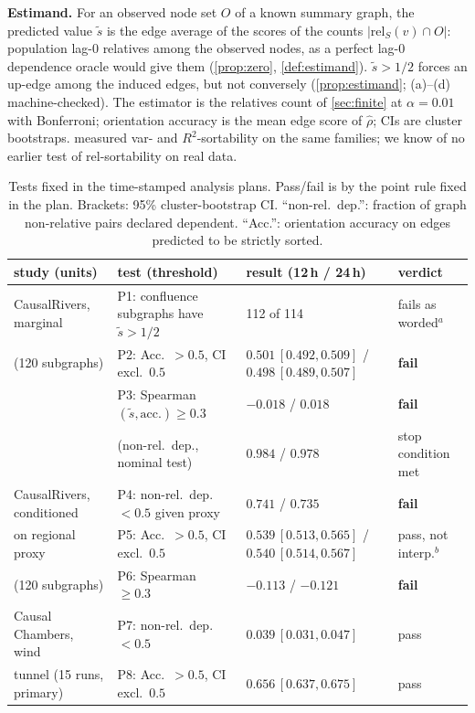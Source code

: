 \documentclass[pdflatex,sn-apa]{sn-jnl}
\theoremstyle{thmstyleone}
\theoremstyle{thmstylethree}
\theoremstyle{thmstyletwo}
\newcommand{\rel}{\mathrm{rel}}
\begin{document}
\textbf{Estimand.} For an observed node set $O$ of a known summary graph, the
predicted value $\tilde s$ is the edge average of the scores of the counts
$|\rel_S(v)\cap O|$: population lag-0 relatives among the observed nodes, as a
perfect lag-0 dependence oracle would give them (\cref{prop:zero},
\cref{def:estimand}). $\tilde s>1/2$ forces an up-edge among the induced
edges, but not conversely (\cref{prop:estimand}; (a)--(d) machine-checked). The
estimator is the relatives count of \cref{sec:finite} at $\alpha=0.01$ with
Bonferroni; orientation accuracy is the mean edge score of $\hat\rho$; CIs are
cluster bootstraps. \citet{lohse2025sortability} measured var- and
$R^2$-sortability on the same families; we know of no earlier test of
rel-sortability on real data.

\begin{table}
\caption{Tests fixed in the time-stamped analysis plans. Pass/fail is by the point rule fixed in the plan.
Brackets: 95\% cluster-bootstrap CI. ``non-rel.\ dep.'': fraction of graph
non-relative pairs declared dependent. ``Acc.'': orientation accuracy on
edges predicted to be strictly sorted.}
\label{tab:real}
\centering
\setlength{\tabcolsep}{2.8pt}
\begin{tabular}{llll}
\toprule
study (units) & test (threshold) & result (12\,h / 24\,h) & verdict \\
\midrule
CausalRivers, marginal & P1: confluence subgraphs have $\tilde s>1/2$ & 112 of 114 & fails as worded$^a$ \\
(120 subgraphs) & P2: Acc.\ $>0.5$, CI excl.\ $0.5$ & $0.501\,[0.492,0.509]$ / $0.498\,[0.489,0.507]$ & \textbf{fail} \\
 & P3: Spearman$(\tilde s,\text{acc.})\ge0.3$ & $-0.018$ / $0.018$ & \textbf{fail} \\
 & \quad (non-rel.\ dep., nominal test) & $0.984$ / $0.978$ & stop condition met \\
\midrule
CausalRivers, conditioned & P4: non-rel.\ dep.\ $<0.5$ given proxy & $0.741$ / $0.735$ & \textbf{fail} \\
on regional proxy & P5: Acc.\ $>0.5$, CI excl.\ $0.5$ & $0.539\,[0.513,0.565]$ / $0.540\,[0.514,0.567]$ & pass, not interp.$^b$ \\
(120 subgraphs) & P6: Spearman $\ge0.3$ & $-0.113$ / $-0.121$ & \textbf{fail} \\
\midrule
Causal Chambers, wind & P7: non-rel.\ dep.\ $<0.5$ & $0.039\,[0.031,0.047]$ & pass \\
tunnel (15 runs, primary) & P8: Acc.\ $>0.5$, CI excl.\ $0.5$ & $0.656\,[0.637,0.675]$ & pass \\

\end{tabular}
\end{table}
\end{document}
